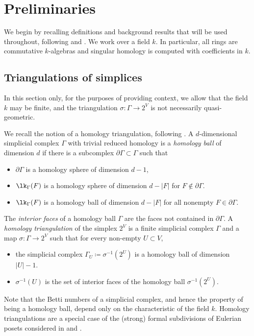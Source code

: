 \section{Preliminaries} \label{sec:sr}

We begin by recalling definitions and background results that will be used throughout, following \cite[Chapter~III]{Stanley96} and \cite{Athanasiadis16}. We work over a field $k$. In particular, all rings are commutative $k$-algebras and singular homology is computed with coefficients in $k$.    

\subsection{Triangulations of simplices} \label{sec:triangulations}
In this section only, for the purposes of providing context, we allow that the field $k$ may be finite, and the triangulation $\sigma \colon \Gamma \to 2^V$ is not necessarily quasi-geometric.

 

We recall the notion of a homology triangulation, following \cite{Athanasiadis12}.  A $d$-dimensional simplicial complex $\Gamma$ with trivial reduced homology is a \emph{homology ball} 
of dimension $d$ if there is a subcomplex $\partial \Gamma \subset \Gamma$  such that 
\begin{itemize}
\item $\partial \Gamma$ is a homology sphere of dimension $d -1$,
\item $\lk_\Gamma(F)$ is a homology sphere of dimension $d - |F|$ for $F \not \in \partial \Gamma$.
\item $\lk_\Gamma(F)$ is a homology ball of dimension $d - |F|$ for all nonempty $F \in \partial \Gamma$.
\end{itemize}
The \emph{interior faces} of a homology ball $\Gamma$ are the faces not contained in $\partial \Gamma$.  A  \emph{homology triangulation} of the simplex $2^V$ is a finite simplicial complex $\Gamma$ and a map $\sigma\colon \Gamma \to 2^V$ such that for every non-empty $U \subset V$,
\begin{itemize}
\item the simplicial complex $\Gamma_U  \coloneqq  \sigma^{-1}(2^U)$ is a homology ball of dimension $\vert U \vert - 1$.
\item $\sigma^{-1}(U)$ is the set of interior faces of the homology ball $\sigma^{-1}(2^U)$.
\end{itemize}
Note that the Betti numbers of a simplicial complex, and hence the property of being a homology ball, depend only on the characteristic of the field $k$. Homology triangulations are a special case of the (strong) formal subdivisions of Eulerian posets considered in \cite[Section~7]{Stanley92} and \cite[Section~3]{KatzStapledon16}.

